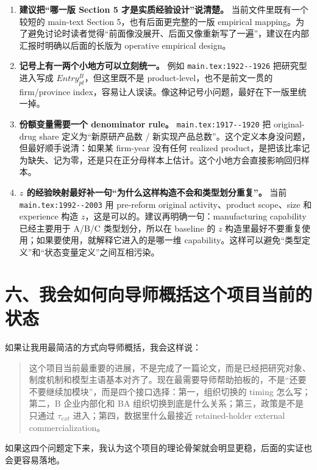 \documentclass[12pt]{ctexart}
\newcommand{\fileref}[1]{\nolinkurl{#1}}
\begin{document}
\begin{enumerate}
\item \textbf{建议把“哪一版 Section 5 才是实质经验设计”说清楚。}
当前文件里既有一个较短的 main-text Section 5，也有后面更完整的一版 empirical mapping。为了避免讨论时读者觉得“前面像没展开、后面又像重新写了一遍”，建议在内部汇报时明确以后面的长版为 operative empirical design。

\item \textbf{记号上有一两个小地方可以立刻统一。}
例如 \fileref{main.tex:1922--1926} 把研究型进入写成 $Entry_{pt}^{B}$，但这里既不是 product-level，也不是前文一贯的 firm/province index，容易让人误读。像这种记号小问题，最好在下一版里统一掉。

\item \textbf{份额变量需要一个 denominator rule。}
\fileref{main.tex:1917--1920} 把 original-drug share 定义为“新原研产品数 / 新实现产品总数”。这个定义本身没问题，但最好顺手说清：如果某 firm-year 没有任何 realized product，是把该比率记为缺失、记为零，还是只在正分母样本上估计。这个小地方会直接影响回归样本。

\item \textbf{$z$ 的经验映射最好补一句“为什么这样构造不会和类型划分重复”。}
当前 \fileref{main.tex:1992--2003} 用 pre-reform original activity、product scope、size 和 experience 构造 $z$，这是可以的。建议再明确一句：manufacturing capability 已经主要用于 A/B/C 类型划分，所以在 baseline 的 $z$ 构造里最好不要重复使用；如果要使用，就解释它进入的是哪一维 capability。这样可以避免“类型定义”和“状态变量定义”之间互相污染。
\end{enumerate}

\section*{六、我会如何向导师概括这个项目当前的状态}

如果让我用最简洁的方式向导师概括，我会这样说：

\begin{quote}
这个项目当前最重要的进展，不是完成了一篇论文，而是已经把研究对象、制度机制和模型主语基本对齐了。现在最需要导师帮助拍板的，不是“还要不要继续加模块”，而是四个接口选择：第一，组织切换的 timing 怎么写；第二，B 企业内部化和 B\textrightarrow A 组织切换到底是什么关系；第三，政策是不是只通过 $\tau_{ext}$ 进入；第四，数据里什么最接近 retained-holder external commercialization。
\end{quote}

如果这四个问题定下来，我认为这个项目的理论骨架就会明显更稳，后面的实证也会更容易落地。
\end{document}
